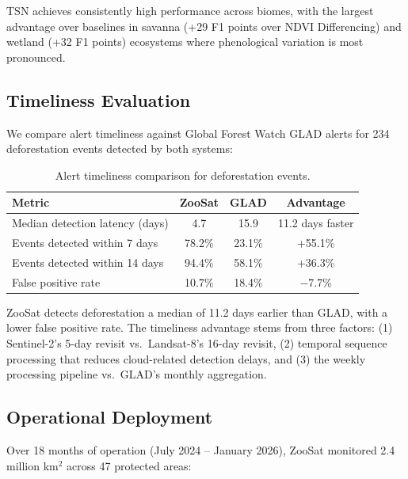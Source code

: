 TSN achieves consistently high performance across biomes, with the largest advantage over baselines in savanna (+29 F1 points over NDVI Differencing) and wetland (+32 F1 points) ecosystems where phenological variation is most pronounced.

\subsection{Timeliness Evaluation}

We compare alert timeliness against Global Forest Watch GLAD alerts for 234 deforestation events detected by both systems:

\begin{table}[H]
\centering
\caption{Alert timeliness comparison for deforestation events.}
\label{tab:timeliness}
\begin{tabular}{@{}lccc@{}}
\toprule
\textbf{Metric} & \textbf{ZooSat} & \textbf{GLAD} & \textbf{Advantage} \\
\midrule
Median detection latency (days) & 4.7 & 15.9 & 11.2 days faster \\
Events detected within 7 days & 78.2\% & 23.1\% & +55.1\% \\
Events detected within 14 days & 94.4\% & 58.1\% & +36.3\% \\
False positive rate & 10.7\% & 18.4\% & $-$7.7\% \\
\bottomrule
\end{tabular}
\end{table}

ZooSat detects deforestation a median of 11.2 days earlier than GLAD, with a lower false positive rate.
The timeliness advantage stems from three factors: (1) Sentinel-2's 5-day revisit vs.\ Landsat-8's 16-day revisit, (2) temporal sequence processing that reduces cloud-related detection delays, and (3) the weekly processing pipeline vs.\ GLAD's monthly aggregation.

\subsection{Operational Deployment}

Over 18 months of operation (July 2024 -- January 2026), ZooSat monitored 2.4 million km$^2$ across 47 protected areas:

